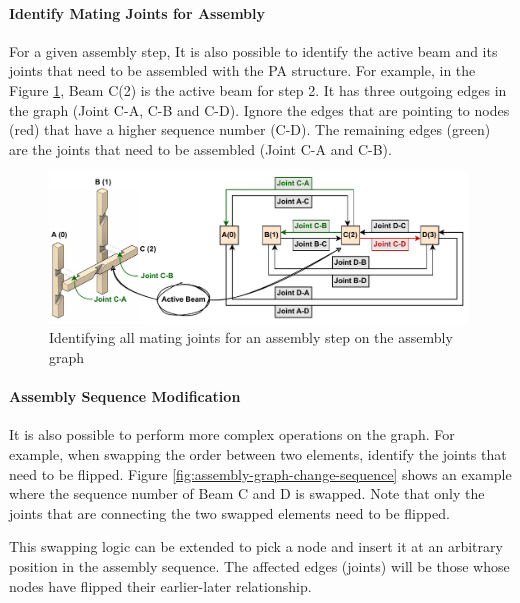 \FloatBarrier

\paragraph{Identify Mating Joints for Assembly}

For a given assembly step, It is also possible to identify the active beam and its joints that need to be assembled with the PA structure. For example, in the Figure \ref{fig:assembly-graph-identify-mating-joints}, Beam C(2) is the active beam for step 2. It has three outgoing edges in the graph (Joint C-A, C-B and C-D). Ignore the edges that are pointing to nodes (red) that have a higher sequence number (C-D). The remaining edges (green) are the joints that need to be assembled (Joint C-A and C-B). 

\begin{figure}[!h]
    \centering
    \includegraphics[width=0.99\textwidth]{images/05/image78.pdf}
    \caption{Identifying all mating joints for an assembly step on the assembly graph}
    \label{fig:assembly-graph-identify-mating-joints}
\end{figure}

\FloatBarrier

\paragraph{Assembly Sequence Modification}

It is also possible to perform more complex operations on the graph. For example, when swapping the order between two elements, identify the joints that need to be flipped. Figure \ref{fig:assembly-graph-change-sequence} shows an example where the sequence number of Beam C and D is swapped. Note that only the joints that are connecting the two swapped elements need to be flipped.

This swapping logic can be extended to pick a node and insert it at an arbitrary position in the assembly sequence.  The affected edges (joints) will be those whose nodes have flipped their earlier-later relationship. 

